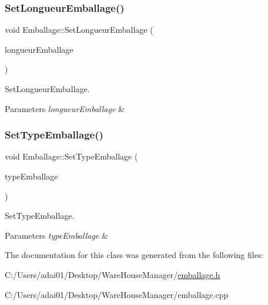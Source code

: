 \subsubsection{\texorpdfstring{Set\+Longueur\+Emballage()}{SetLongueurEmballage()}}
{\footnotesize\ttfamily void Emballage\+::\+Set\+Longueur\+Emballage (\begin{DoxyParamCaption}\item[{int}]{longueur\+Emballage }\end{DoxyParamCaption})}



Set\+Longueur\+Emballage. 


\begin{DoxyParams}{Parameters}
{\em longueur\+Emballage} & \\
\hline
\end{DoxyParams}
\mbox{\label{class_emballage_af26f49fa86f70ec4bbb5eaca71865570}} 
\subsubsection{\texorpdfstring{Set\+Type\+Emballage()}{SetTypeEmballage()}}
{\footnotesize\ttfamily void Emballage\+::\+Set\+Type\+Emballage (\begin{DoxyParamCaption}\item[{Q\+String}]{type\+Emballage }\end{DoxyParamCaption})}



Set\+Type\+Emballage. 


\begin{DoxyParams}{Parameters}
{\em type\+Emballage} & \\
\hline
\end{DoxyParams}


The documentation for this class was generated from the following files\+:\begin{DoxyCompactItemize}
\item 
C\+:/\+Users/adai01/\+Desktop/\+Ware\+House\+Manager/\mbox{\hyperlink{emballage_8h}{emballage.\+h}}\item 
C\+:/\+Users/adai01/\+Desktop/\+Ware\+House\+Manager/emballage.\+cpp\end{DoxyCompactItemize}
